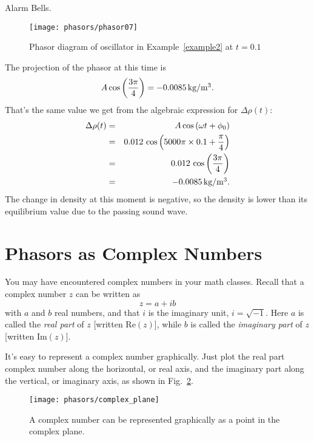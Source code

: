\begin{exampleb}{Alarm Bells.}
\begin{solution}
\begin{figure}\begin{center}
 \texttt{[image: phasors/phasor07]} 
\caption{\label{fig:phasor07}Phasor diagram of oscillator in
Example~\ref{example2} at $t=0.1$}
\end{center}
\end{figure}

The projection of the phasor at this time is
\begin{equation}
A\cos{\left(\frac{3\pi}{4}\right)} = -0.0085\,\mbox{kg/m$^3$}. 
\end{equation}
That's the same value we get from the algebraic expression for 
$\Delta \rho (t)$:
\begin{eqnarray}
\Delta \rho (t) & = & A \cos{\left( \omega t + \phi_0\right)}\nonumber\\
               & = & 0.012\, \cos{\left(5000\pi\times 0.1 
                    + \frac{\pi}{4}\right)} \nonumber\\
               & = & 0.012\, \cos{\left(\frac{3\pi}{4}\right)}\nonumber\\
               & = &  -0.0085\,\mbox{kg/m$^3$}.
\end{eqnarray}
The change in density at this moment is negative, so the density is
lower than its equilibrium value due to the passing sound wave.
\end{solution}
\end{exampleb}


\section{Phasors as Complex Numbers}

You may have encountered complex numbers in your math classes.
Recall that a complex number $z$ can be written as
\begin{equation}
z = a + ib
\end{equation}
with $a$ and $b$ real numbers, and that $i$ is the imaginary unit, 
$i = \sqrt{-1}$.  Here $a$ is called the \textit{real part} of  $z$ 
[written $\mbox{Re}(z)$], while $b$ is called the \textit{imaginary part} 
of $z$ [written $\mbox{Im}(z)$].

It's easy to represent a complex number  graphically.  Just plot the 
real part complex number along the horizontal, or real axis, 
and the imaginary part along the vertical, or imaginary axis,
as shown in Fig.~\ref{fig:complexPlane}.

\begin{figure}\begin{center}
\texttt{[image: phasors/complex\_plane]}  
\caption{\label{fig:complexPlane} A complex number can be represented
graphically as a point in the complex plane.}
\end{center}
\end{figure}


